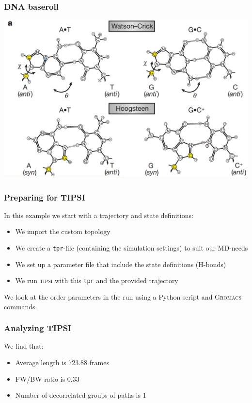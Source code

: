 \documentclass[hyperref={pdfpagelabels=false}]{beamer}
\begin{document}
\begin{frame}
\frametitle{DNA baseroll} 
\begin{center}
\includegraphics[scale=0.2]{images/pairing.png}
\end{center}
\end{frame}

\begin{frame}
\frametitle{Preparing for \textsc{TIPSI}} 
In this example we start with a trajectory and state definitions:
\begin{itemize}
\item We import the custom topology
\item We create a \texttt{tpr}-file (containing the simulation settings) to suit our MD-needs
\item We set up a parameter file that include the state definitions (H-bonds)
\item We run \textsc{tipsi} with this \texttt{tpr} and the provided trajectory
\end{itemize}
We look at the order parameters in the run using a Python script and \textsc{Gromacs} commands.
\end{frame}

\begin{frame}
\frametitle{Analyzing \textsc{TIPSI}}

We find that:

\begin{itemize}
\item Average length is 723.88 frames
\item FW/BW ratio is 0.33
\item Number of decorrelated groups of paths is 1
\end{itemize}
\end{frame}
\end{document}
